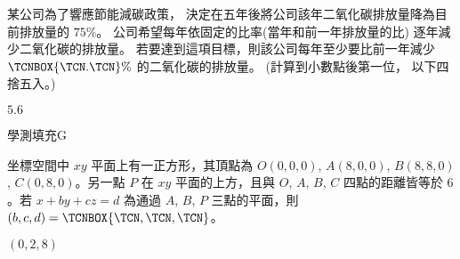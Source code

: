 \begin{QUESTIONS}
\begin{QUESTION}
\begin{QBODY}
            某公司為了響應節能減碳政策， 決定在五年後將公司該年二氧化碳排放量降為目前排放量的 $75 \%$。 公司希望每年依固定的比率(當年和前一年排放量的比) 逐年減少二氧化碳的排放量。 若要達到這項目標，則該公司每年至少要比前一年減少 $\TCNBOX{\TCN.\TCN} \%$ 的二氧化碳的排放量。 (計算到小數點後第一位， 以下四捨五入。)
        \end{QBODY}
        \begin{QFROMS}
        \end{QFROMS}
        \begin{QTAGS}\end{QTAGS}
        \begin{QANS}
            $5.6$
        \end{QANS}
        \begin{QSOLLIST}
        \end{QSOLLIST}
        \begin{QEMPTYSPACE}
        \end{QEMPTYSPACE}
    \end{QUESTION}
    \begin{QUESTION}
        \begin{ExamInfo}{98}{學測}{填充}{G}
        \end{ExamInfo}
        \begin{ExamAnsRateInfo}{36}{80}{26}{2}
        \end{ExamAnsRateInfo}
        \begin{QBODY}
            坐標空間中 $xy$ 平面上有一正方形，其頂點為 $O(0,0,0)$, $A(8,0,0)$, $B(8,8,0)$, $C(0,8,0)$。另一點 $P$ 在 $xy$ 平面的上方，且與 $O$, $A$, $B$, $C$ 四點的距離皆等於 $6$。若 $x + by + cz = d$ 為通過 $A$, $B$, $P$ 三點的平面，則 $(b,c,d)=\TCNBOX{\TCN,\TCN,\TCN}$。
        \end{QBODY}
        \begin{QFROMS}
        \end{QFROMS}
        \begin{QTAGS}\end{QTAGS}
        \begin{QANS}
            $(0,2,8)$
        \end{QANS}
        \begin{QSOLLIST}
        \end{QSOLLIST}
        \begin{QEMPTYSPACE}
        \end{QEMPTYSPACE}
    \end{QUESTION}

\end{QUESTIONS}
